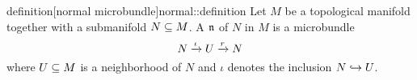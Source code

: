 \begin{mystatement}{definition}[normal microbundle]{normal::definition}
    Let $M$ be a topological manifold together with a submanifold $N \subseteq{} M$.
    A  $\mathfrak{n}$ of $N$ in $M$ is a microbundle
    \[ N \xrightarrow{\iota} U \xrightarrow{r} N{} \]
    where $U \subseteq{} M$ is a neighborhood of $N$ and $\iota$ denotes the inclusion $N \hookrightarrow{} U$.
\end{mystatement}